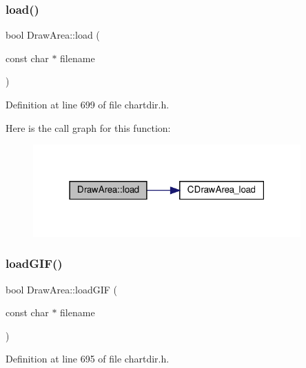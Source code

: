 \subsubsection{\texorpdfstring{load()}{load()}}
{\footnotesize\ttfamily bool Draw\+Area\+::load (\begin{DoxyParamCaption}\item[{const char $\ast$}]{filename }\end{DoxyParamCaption})\hspace{0.3cm}{\ttfamily [inline]}}



Definition at line 699 of file chartdir.\+h.

Here is the call graph for this function\+:
\nopagebreak
\begin{figure}[H]
\begin{center}
\leavevmode
\includegraphics[width=291pt]{class_draw_area_a4b52e06f246a047d3c9bff043fe300c3_cgraph}
\end{center}
\end{figure}
\mbox{\label{class_draw_area_acfa51d737299f007c15e38e9c71c6d74}} 
\subsubsection{\texorpdfstring{load\+G\+I\+F()}{loadGIF()}}
{\footnotesize\ttfamily bool Draw\+Area\+::load\+G\+IF (\begin{DoxyParamCaption}\item[{const char $\ast$}]{filename }\end{DoxyParamCaption})\hspace{0.3cm}{\ttfamily [inline]}}



Definition at line 695 of file chartdir.\+h.


